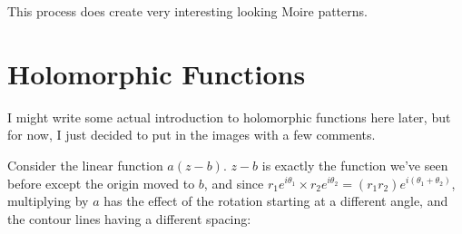 \documentclass[xhtml, mathjax]{article}
\begin{document}
    This process does create very interesting looking Moire patterns.


  \section{Holomorphic Functions}

    I might write some actual introduction to holomorphic functions here later,
    but for now, I just decided to put in the images with a few comments.

    Consider the linear function $a(z-b)$. $z-b$ is exactly the
    function we've seen before except the origin moved to $b$, and since
    $r_1e^{i\theta_1} \times r_2e^{i\theta_2} = (r_1 r_2) e^{i(\theta_1 +
    \theta_2)}$, multiplying by $a$ has the effect of the rotation starting at a
    different angle, and the contour lines having a different spacing:
\end{document}
